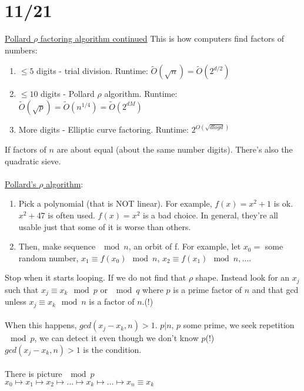 \documentclass[13pt]{article}
\begin{document}
	\section*{11/21}
		\underline{Pollard $\rho$ factoring algorithm continued}
			This is how computers find factors of numbers:\\
			\begin{enumerate}
				\item $\le 5$ digits - trial division. Runtime: $\tilde{O}(\sqrt{n})
					= \tilde{O}(2^{d/2})$
				\item $\le 10$ digits - Pollard $\rho$ algorithm. Runtime:
					$\tilde{O}(\sqrt{p}) = \tilde{O}(n^{1/4}) = \tilde{O}(2^{dM})$
				\item More digits - Elliptic curve factoring. Runtime:
				$2^{O(\sqrt{d log d})}$
			\end{enumerate}
		If factors of $n$ are about equal (about the same number digits).
		There's also the quadratic sieve.\\\\
		\underline{Pollard's $\rho$ algorithm}:
		\begin{enumerate}
			\item Pick a polynomial (that is NOT linear). For example, $f(x) = 
					x^2 + 1$ is ok. $x^2 + 47$ is often used. $f(x) = x^2$ is a bad
					choice. In general, they're all usable just that some of it is 
					worse	than others.
			\item Then, make sequence $\mod n$, an orbit of f. For example,
				let $x_0 = $ some random number, $x_1 \equiv f(x_0) \mod n$, 
				$x_2 \equiv f(x_1) \mod n, \ldots$.\\
		\end{enumerate}
			 Stop when it starts looping. If we do not find that $\rho$
				shape. Instead look for an $x_j$ such that $x_j \equiv x_k \mod p$ or
				$\mod q$ where $p$ is a prime factor of $n$ and that gcd unless
				$x_j \equiv x_k \mod n$ is a factor of $n$.(!) \\\\
				When this happens,
				$gcd(x_j - x_k, n) > 1$. $p|n$, $p$ some prime, we seek repetition
				$\mod p$, we can detect it even though we don't know $p$(!) \\
				$gcd(x_j - x_k, n) > 1$ is the condition. \\\\
				There is picture $\mod p$\\
				$x_0 \mapsto x_1 \mapsto x_2 \mapsto \ldots \mapsto x_k \mapsto
				\ldots \mapsto x_n \equiv x_k$\\\\
\end{document}
